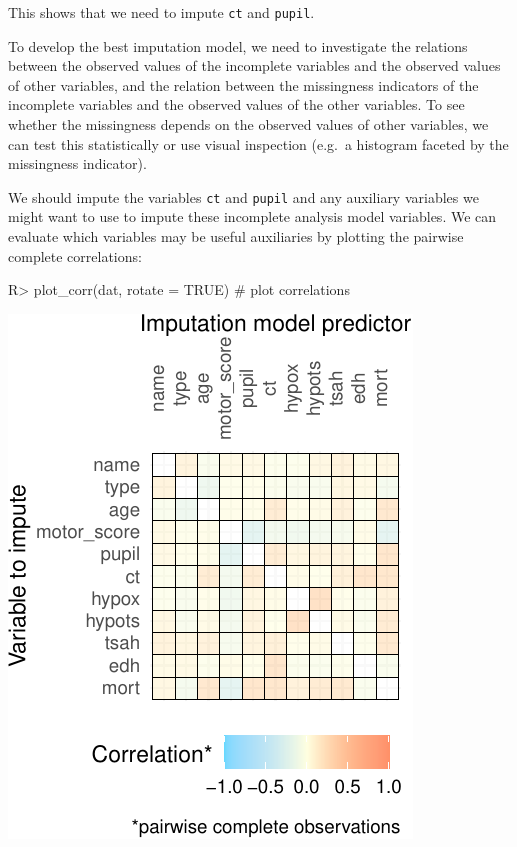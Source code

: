 \documentclass[
]{jss}
\begin{document}
This shows that we need to impute \texttt{ct} and \texttt{pupil}.

To develop the best imputation model, we need to investigate the
relations between the observed values of the incomplete variables and
the observed values of other variables, and the relation between the
missingness indicators of the incomplete variables and the observed
values of the other variables. To see whether the missingness depends on
the observed values of other variables, we can test this statistically
or use visual inspection (e.g.~a histogram faceted by the missingness
indicator).

We should impute the variables \texttt{ct} and \texttt{pupil} and any
auxiliary variables we might want to use to impute these incomplete
analysis model variables. We can evaluate which variables may be useful
auxiliaries by plotting the pairwise complete correlations:

\begin{CodeChunk}
\begin{CodeInput}
R> plot_corr(dat, rotate = TRUE) # plot correlations 
\end{CodeInput}


\begin{center}\includegraphics{Imputation_of_Incomplete_Multilevel_Data_files/figure-latex/impact_corr-1} \end{center}

\end{CodeChunk}
\end{document}
